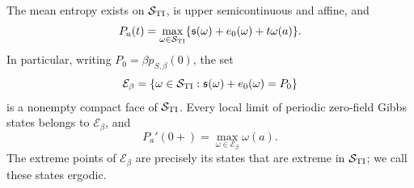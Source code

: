 \begin{proposition}\label{prop:variational-framework}
The mean entropy exists on $\mathcal S_{\rm TI}$, is upper
semicontinuous and affine, and
\begin{equation}\label{eq:variational-pressure}
 P_a(t)=\max_{\omega\in\mathcal S_{\rm TI}}
       \{\mathfrak s(\omega)+e_0(\omega)+t\omega(a)\}.
\end{equation}
In particular, writing $P_0=\beta p_{S,\beta}(0)$, the set
\[
 \mathcal E_\beta=
 \{\omega\in\mathcal S_{\rm TI}:
            \mathfrak s(\omega)+e_0(\omega)=P_0\}
\]
is a nonempty compact face of $\mathcal S_{\rm TI}$.  Every local limit
of periodic zero-field Gibbs states belongs to $\mathcal E_\beta$,
and
\begin{equation}\label{eq:pressure-tangent}
 P_a'(0+)=\max_{\omega\in\mathcal E_\beta}\omega(a).
\end{equation}
The extreme points of $\mathcal E_\beta$ are precisely its states that
are extreme in $\mathcal S_{\rm TI}$; we call these states ergodic.
\end{proposition}


